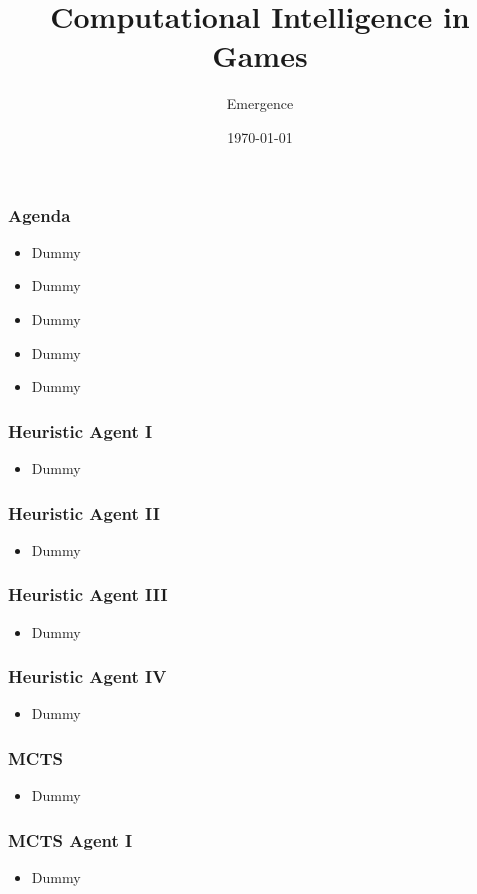 \documentclass{beamer}
\title{Computational Intelligence in Games}
\author{Emergence}
\date{\today}
\institute{Otto-von-Guericke-University Magdeburg}
\begin{document}
\begin{frame}[plain]
 \titlepage
\end{frame}

\begin{frame}
\frametitle{Agenda}
\begin{itemize}
\item Dummy
\item Dummy
\item Dummy
\item Dummy
\item Dummy
\end{itemize}
\end{frame}


\begin{frame}
\frametitle{Heuristic Agent I}
\begin{itemize}
\item Dummy
\end{itemize}
\end{frame}

\begin{frame}
\frametitle{Heuristic Agent II}
\begin{itemize} \item Dummy
\end{itemize}
\end{frame}


\begin{frame}
\frametitle{Heuristic Agent III}
\begin{itemize}
 \item Dummy
\end{itemize}
\end{frame}

\begin{frame}
\frametitle{Heuristic Agent IV}
\begin{itemize}
 \item Dummy
\end{itemize}
\end{frame}



\begin{frame}
\frametitle{MCTS}
\begin{itemize}
 \item Dummy
\end{itemize}
\end{frame}

\begin{frame}
\frametitle{MCTS Agent I}
\begin{itemize}
 \item Dummy
\end{itemize}
\end{frame}
\end{document}

